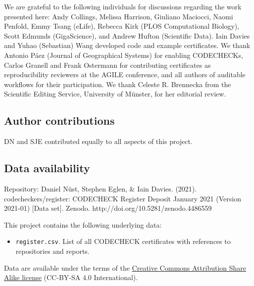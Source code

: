 \documentclass[12pt]{article}
\begin{document}
We are grateful to the following individuals for discussions regarding
the work presented here: Andy Collings, Melissa Harrison, Giuliano
Maciocci, Naomi Penfold, Emmy Tsang (eLife), Rebecca Kirk (PLOS
Computational Biology), Scott Edmunds (GigaScience), and Andrew Hufton
(Scientific Data). Iain Davies and Yuhao (Sebastian) Wang developed
code and example certificates.  We thank Antonio P\'{a}ez (Journal of
Geographical Systems) for enabling CODECHECKs, Carlos Granell and
Frank Ostermann for contributing certificates as reproducibility
reviewers at the AGILE conference, and all authors of auditable
workflows for their participation.  We thank Celeste R. Brennecka from
the Scientific Editing Service, University of M\"unster, for her
editorial review.

\subsection*{Author contributions}

DN and SJE contributed equally to all aspects of this project.

\subsection{Data availability}

Repository: Daniel Nüst, Stephen Eglen, \& Iain Davies. (2021). codecheckers/register: CODECHECK Register Deposit January 2021 (Version 2021-01) [Data set]. Zenodo. http://doi.org/10.5281/zenodo.4486559

This project contains the following underlying data:

\begin{itemize}
  \item \texttt{register.csv}. List of all CODECHECK certificates with references to repositories and reports.
\end{itemize}

Data are available under the terms of the \href{https://creativecommons.org/licenses/by-sa/4.0/legalcode}{Creative Commons Attribution Share Alike license} (CC-BY-SA 4.0 International).

{\small
}
\end{document}
